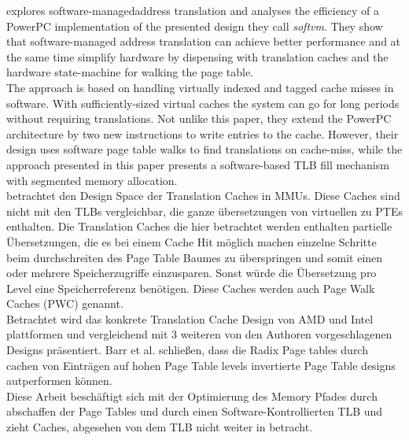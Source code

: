 \textbf{\cite{jacobSoftwaremanagedAddressTranslation1997}}explores software-managedaddress translation and analyses the efficiency of a PowerPC implementation
of the presented design they call \textit{softvm}. They show that
software-managed address translation can achieve better performance and
at the same time simplify hardware by dispensing with translation caches and
the hardware state-machine for walking the page table.\\
The approach is based on handling virtually indexed and tagged cache misses in
software.
With sufficiently-sized virtual caches the system can go for long periods
without requiring translations.
Not unlike this paper, they extend the PowerPC architecture by two new instructions
to write entries to the cache. However, their design uses software page table
walks to find translations on cache-miss, while the approach presented in this
paper presents a software-based TLB fill mechanism with segmented
memory allocation.\\


\textbf{\cite{barrTranslationCachingSkip}}betrachtet den Design Space der Translation Caches in MMUs. Diese Caches sind nicht mit den TLBs
vergleichbar, die ganze übersetzungen von virtuellen zu PTEs enthalten. Die Translation Caches
die hier betrachtet werden enthalten partielle Übersetzungen, die es bei einem Cache Hit möglich
machen einzelne Schritte beim durchschreiten des Page Table Baumes zu überspringen und somit
einen oder mehrere Speicherzugriffe einzusparen. Sonst würde die Übersetzung pro Level eine
Speicherreferenz benötigen. Diese Caches werden auch Page Walk Caches (PWC) \cite{yaniv2016hash} genannt.\\
Betrachtet wird das konkrete Translation Cache Design von AMD und Intel plattformen und vergleichend
mit 3 weiteren von den Authoren vorgeschlagenen Designs präsentiert. Barr et al. schließen,
dass die Radix Page tables durch cachen von Einträgen auf hohen Page Table levels invertierte Page
Table designs autperformen können.\\
Diese Arbeit beschäftigt sich mit der Optimierung des Memory Pfades durch abschaffen der Page Tables
und durch einen Software-Kontrollierten TLB und zieht Caches, abgesehen von dem TLB nicht weiter in
betracht.

